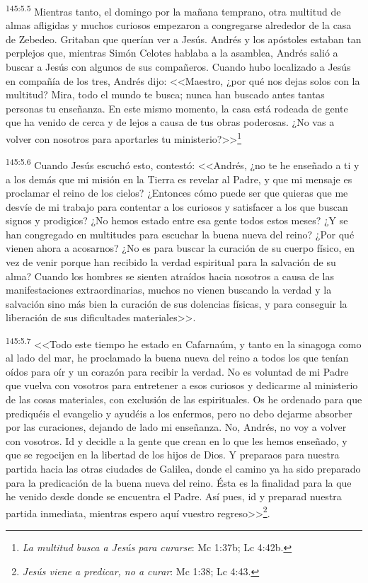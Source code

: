 \par 
\textsuperscript{145:5.5} Mientras tanto, el domingo por la mañana temprano, otra multitud de almas afligidas y muchos curiosos empezaron a congregarse alrededor de la casa de Zebedeo. Gritaban que querían ver a Jesús. Andrés y los apóstoles estaban tan perplejos que, mientras Simón Celotes hablaba a la asamblea, Andrés salió a buscar a Jesús con algunos de sus compañeros. Cuando hubo localizado a Jesús en compañía de los tres, Andrés dijo: <<Maestro, ¿por qué nos dejas solos con la multitud? Mira, todo el mundo te busca; nunca han buscado antes tantas personas tu enseñanza. En este mismo momento, la casa está rodeada de gente que ha venido de cerca y de lejos a causa de tus obras poderosas. ¿No vas a volver con nosotros para aportarles tu ministerio?>>\footnote{\textit{La multitud busca a Jesús para curarse}: Mc 1:37b; Lc 4:42b.}

\par 
\textsuperscript{145:5.6} Cuando Jesús escuchó esto, contestó: <<Andrés, ¿no te he enseñado a ti y a los demás que mi misión en la Tierra es revelar al Padre, y que mi mensaje es proclamar el reino de los cielos? ¿Entonces cómo puede ser que quieras que me desvíe de mi trabajo para contentar a los curiosos y satisfacer a los que buscan signos y prodigios? ¿No hemos estado entre esa gente todos estos meses? ¿Y se han congregado en multitudes para escuchar la buena nueva del reino? ¿Por qué vienen ahora a acosarnos? ¿No es para buscar la curación de su cuerpo físico, en vez de venir porque han recibido la verdad espiritual para la salvación de su alma? Cuando los hombres se sienten atraídos hacia nosotros a causa de las manifestaciones extraordinarias, muchos no vienen buscando la verdad y la salvación sino más bien la curación de sus dolencias físicas, y para conseguir la liberación de sus dificultades materiales>>.

\par 
\textsuperscript{145:5.7} <<Todo este tiempo he estado en Cafarnaúm, y tanto en la sinagoga como al lado del mar, he proclamado la buena nueva del reino a todos los que tenían oídos para oír y un corazón para recibir la verdad. No es voluntad de mi Padre que vuelva con vosotros para entretener a esos curiosos y dedicarme al ministerio de las cosas materiales, con exclusión de las espirituales. Os he ordenado para que prediquéis el evangelio y ayudéis a los enfermos, pero no debo dejarme absorber por las curaciones, dejando de lado mi enseñanza. No, Andrés, no voy a volver con vosotros. Id y decidle a la gente que crean en lo que les hemos enseñado, y que se regocijen en la libertad de los hijos de Dios. Y preparaos para nuestra partida hacia las otras ciudades de Galilea, donde el camino ya ha sido preparado para la predicación de la buena nueva del reino. Ésta es la finalidad para la que he venido desde donde se encuentra el Padre. Así pues, id y preparad nuestra partida inmediata, mientras espero aquí vuestro regreso>>\footnote{\textit{Jesús viene a predicar, no a curar}: Mc 1:38; Lc 4:43.}.

